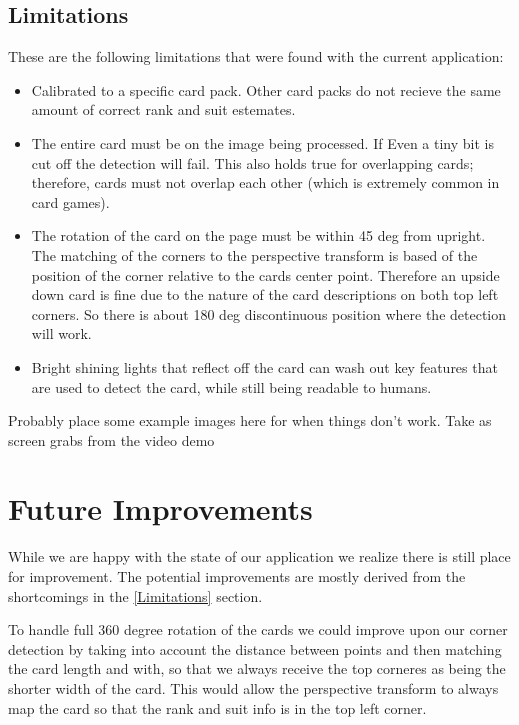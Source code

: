 \documentclass[conference]{IEEEtran}
\begin{document}
\subsection{Limitations}
These are the following limitations that were found with the current application:
\begin{itemize}
\item Calibrated to a specific card pack. Other card packs do not recieve the same amount of correct
        rank and suit estemates.
\item The entire card must be on the image being processed. If Even a tiny bit is cut off the
        detection will fail. This also holds true for overlapping cards; therefore, cards must not
        overlap each other (which is extremely common in card games).
\item The rotation of the card on the page must be within 45 deg from upright. The matching of the
        corners to the perspective transform is based of the position of the corner relative to the
        cards center point. Therefore an upside down card is fine due to the nature of the card
        descriptions on both top left corners. So there is about 180 deg discontinuous position
        where the detection will work.
\item Bright shining lights that reflect off the card can wash out key features that are used to
        detect the card, while still being readable to humans.
\end{itemize}

Probably place some example images here for when things don't work. Take as screen grabs from the
video demo


\section{Future Improvements}
While we are happy with the state of our application we realize there is still place for
improvement. The potential improvements are mostly derived from the shortcomings in the
\ref{Limitations} section.

To handle full 360 degree rotation of the cards we could improve upon our corner detection by taking
into account the distance between points and then matching the card length and with, so that we
always receive the top corneres as being the shorter width of the card. This would allow the
perspective transform to always map the card so that the rank and suit info is in the top left
corner.
\end{document}
